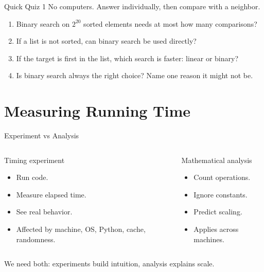 \documentclass[aspectratio=169,xcolor=dvipsnames]{beamer}
\begin{document}
\begin{frame}{Quick Quiz 1}
  No computers. Answer individually, then compare with a neighbor.
  \begin{enumerate}
    \item Binary search on $2^{20}$ sorted elements needs at most how many comparisons?
    \item If a list is not sorted, can binary search be used directly?
    \item If the target is first in the list, which search is faster: linear or binary?
    \item Is binary search always the right choice? Name one reason it might not be.
  \end{enumerate}
\end{frame}

\section{Measuring Running Time}

\begin{frame}{Experiment vs Analysis}
  \begin{columns}
    \begin{block}{Timing experiment}
      \begin{itemize}
        \item Run code.
        \item Measure elapsed time.
        \item See real behavior.
        \item Affected by machine, OS, Python, cache, randomness.
      \end{itemize}
    \end{block}
    \begin{exampleblock}{Mathematical analysis}
      \begin{itemize}
        \item Count operations.
        \item Ignore constants.
        \item Predict scaling.
        \item Applies across machines.
      \end{itemize}
    \end{exampleblock}
  \end{columns}
  \vspace{0.6em}
  We need both: experiments build intuition, analysis explains scale.
\end{frame}
\end{document}
